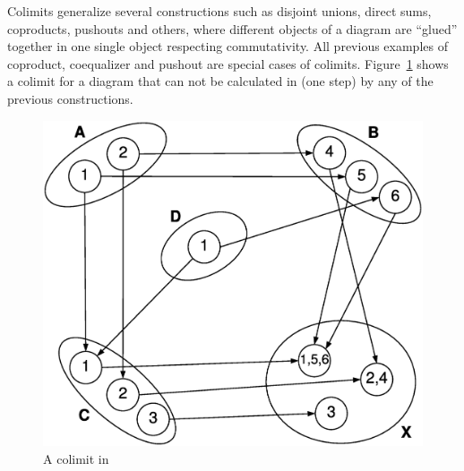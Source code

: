\begin{example} Colimits generalize several constructions such as disjoint unions, direct sums, coproducts, pushouts and others, where different objects of a diagram are ``glued'' together in one single object respecting commutativity. All previous examples of coproduct, coequalizer and pushout are special cases of colimits. Figure~\ref{fig:gts:colimit} shows a colimit for a diagram that can not be calculated in (one step) by any of the previous constructions.

\begin{figure}[!ht]
  \centering
  \includegraphics[scale=0.4]{images/gts/colimit}
  \caption{A colimit in }\label{fig:gts:colimit}
\end{figure}

\end{example}

